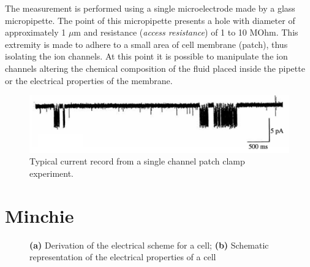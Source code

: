 \documentclass[a4paper]{article}
\begin{document}
The measurement is performed using a single microelectrode made by a glass micropipette.
The point of this micropipette presents a hole with diameter of approximately 1 $\mu$m and resistance (\emph{access resistance}) of 1 to 10 MOhm.
This extremity is made to adhere to a small area of cell membrane (patch), thus isolating the ion channels.
At this point it is possible to manipulate the ion channels altering the chemical composition of the fluid placed inside the pipette or the electrical properties of the membrane.

\begin{figure}[h]
\centering
\includegraphics[width=.8\textwidth]{Patch_clamp_current_records.png}
\caption{Typical current record from a single channel patch clamp experiment.}
\label{fig:patch_single_ch}
\end{figure}

\section{Minchie}



\begin{figure}
\centering
{}
\caption{\textbf{(a)} Derivation of the electrical scheme for a cell; \textbf{(b)} Schematic representation of the electrical properties of a cell}

\end{figure}
\end{document}
